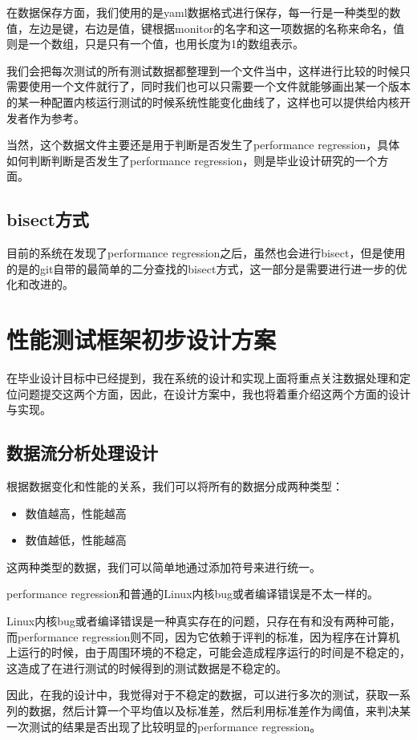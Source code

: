 \documentclass[CJK,12pt]{article}
\begin{document}
在数据保存方面，我们使用的是yaml数据格式进行保存，每一行是一种类型的数值，左边是键，右边是值，键根据monitor的名字和这一项数据的名称来命名，值则是一个数组，只是只有一个值，也用长度为1的数组表示。

我们会把每次测试的所有测试数据都整理到一个文件当中，这样进行比较的时候只需要使用一个文件就行了，同时我们也可以只需要一个文件就能够画出某一个版本的某一种配置内核运行测试的时候系统性能变化曲线了，这样也可以提供给内核开发者作为参考。

当然，这个数据文件主要还是用于判断是否发生了performance regression，具体如何判断判断是否发生了performance regression，则是毕业设计研究的一个方面。


\subsection{bisect方式}
目前的系统在发现了performance regression之后，虽然也会进行bisect，但是使用的是的git自带的最简单的二分查找的bisect方式，这一部分是需要进行进一步的优化和改进的。


\section{性能测试框架初步设计方案}
在毕业设计目标中已经提到，我在系统的设计和实现上面将重点关注数据处理和定位问题提交这两个方面，因此，在设计方案中，我也将着重介绍这两个方面的设计与实现。

\subsection{数据流分析处理设计}
根据数据变化和性能的关系，我们可以将所有的数据分成两种类型：
\begin{itemize}
\item 数值越高，性能越高
\item 数值越低，性能越高
\end{itemize}
这两种类型的数据，我们可以简单地通过添加符号来进行统一。

performance regression和普通的Linux内核bug或者编译错误是不太一样的。

Linux内核bug或者编译错误是一种真实存在的问题，只存在有和没有两种可能，而performance regression则不同，因为它依赖于评判的标准，因为程序在计算机上运行的时候，由于周围环境的不稳定，可能会造成程序运行的时间是不稳定的，这造成了在进行测试的时候得到的测试数据是不稳定的。

因此，在我的设计中，我觉得对于不稳定的数据，可以进行多次的测试，获取一系列的数据，然后计算一个平均值以及标准差，然后利用标准差作为阈值，来判决某一次测试的结果是否出现了比较明显的performance regression。
\end{document}
